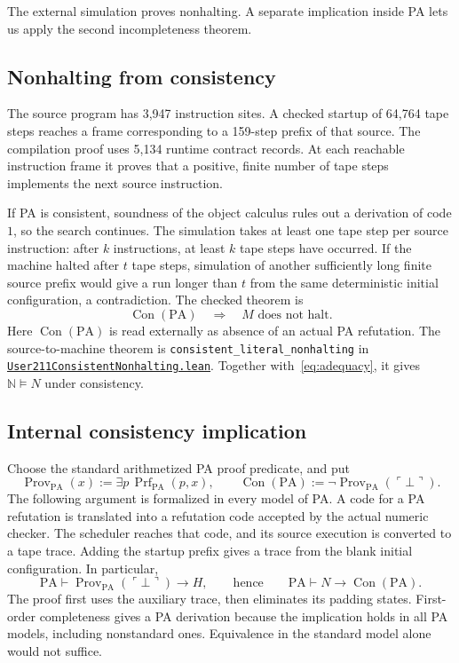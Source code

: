 \documentclass[11pt,letterpaper]{article}
\newcommand{\PA}{\mathrm{PA}}
\newcommand{\NN}{\mathbb{N}}
\newcommand{\Con}{\operatorname{Con}}
\newcommand{\Prf}{\operatorname{Prf}}
\newcommand{\Prov}{\operatorname{Prov}}
\newcommand{\code}[1]{\ulcorner #1\urcorner}
\newcommand{\src}[2]{\href{https://github.com/jamesyc/BusyBeaver/blob/main/#1}{\texttt{\nolinkurl{#2}}}}
\newcommand{\repo}[1]{\texttt{\nolinkurl{#1}}}
\begin{document}
The external simulation proves nonhalting. A separate implication inside
PA lets us apply the second incompleteness theorem.

\subsection{Nonhalting from consistency}

The source program has 3,947 instruction sites. A checked startup of
64,764 tape steps reaches a frame corresponding to a 159-step prefix of
that source. The compilation proof uses 5,134 runtime contract records.
At each reachable instruction frame it proves that a positive, finite
number of tape steps implements the next source instruction.

If PA is consistent, soundness of the object calculus rules out a
derivation of code $1$, so the search continues. The simulation takes at
least one tape step per source instruction: after $k$ instructions, at
least $k$ tape steps have occurred. If the machine halted after $t$ tape steps, simulation of
another sufficiently long finite source prefix would give a run longer
than $t$ from the same deterministic initial configuration, a
contradiction. The checked theorem is
\begin{equation}\label{eq:external}
\Con(\PA)\quad\Longrightarrow\quad M\text{ does not halt}.
\end{equation}
Here $\Con(\PA)$ is read externally as absence of an actual PA refutation.
The source-to-machine theorem is \repo{consistent_literal_nonhalting} in
\src{Lean/metamathematics/User211ConsistentNonhalting.lean}{User211ConsistentNonhalting.lean}.
Together with~\eqref{eq:adequacy}, it gives $\NN\models N$ under consistency.

\subsection{Internal consistency implication}

Choose the standard arithmetized PA proof predicate, and put
\[
\Prov_{\PA}(x):=\exists p\,\Prf_{\PA}(p,x),\qquad
\Con(\PA):=\neg\Prov_{\PA}(\code{\bot}).
\]
The following argument is formalized in every model of PA.
A code for a PA refutation is translated into a refutation code accepted
by the actual numeric checker. The scheduler reaches that code, and its
source execution is converted to a tape trace. Adding the startup prefix
gives a trace from the blank initial configuration. In particular,
\[
\PA\vdash \Prov_{\PA}(\code{\bot})\to H,
\qquad\text{hence}\qquad
\boxed{\PA\vdash N\to\Con(\PA).}
\]
The proof first uses the auxiliary trace, then eliminates its padding
states. First-order completeness gives a PA derivation because the
implication holds in all PA models, including nonstandard ones.
Equivalence in the standard model alone would not suffice.
\end{document}
